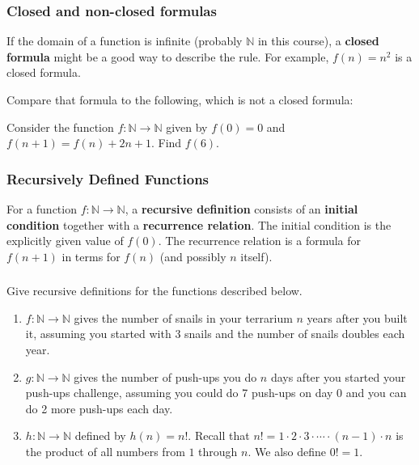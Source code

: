 \documentclass[11pt, compress]{beamer}
\newcommand{\terminology}[1]{\textbf{#1}}\newcommand{\lt}{<}
\newcommand{\N}{\mathbb N}
\begin{document}
\begin{frame}
\frametitle{Closed and non-closed formulas}
 If the domain of a function is infinite (probably \(\N\) in this course), a \terminology{closed formula} might be a good way to describe the rule.  For example, \(f(n) = n^2\) is a closed formula.
 
\pause \vfill 

Compare that formula to the following, which is not a closed formula:
 \begin{example}[0.4.4]Consider the function \(f:\N \to \N\) given by \(f(0) = 0\) and \(f(n+1) = f(n) + 2n+1\). Find \(f(6)\).
\end{example}
\end{frame}
 
\begin{frame}
\frametitle{Recursively Defined Functions}
 For a function \(f:\N \to \N\), a \terminology{recursive definition} consists of an \terminology{initial condition} together with a \terminology{recurrence relation}. The initial condition is the explicitly given value of \(f(0)\). The recurrence relation is a formula for \(f(n+1)\) in terms for \(f(n)\) (and possibly \(n\) itself).
\end{frame}
 
\begin{frame}
\frametitle{}
\begin{example}[0.4.5]Give recursive definitions for the functions described below.
\pause 

\begin{enumerate}[<+->]
\item{} \(f:\N \to \N\) gives the number of snails in your terrarium \(n\) years after you built it, assuming you started with 3 snails and the number of snails doubles each year.


\item{} \(g:\N \to \N\) gives the number of push-ups you do \(n\) days after you started your push-ups challenge, assuming you could do 7 push-ups on day 0 and you can do 2 more push-ups each day.


\item{} \(h:\N \to \N\) defined by \(h(n) = n!\). Recall that \(n! = 1 \cdot 2 \cdot 3 \cdot \cdots \cdot (n-1)\cdot n\) is the product of all numbers from \(1\) through \(n\). We also define \(0! = 1\).

\end{enumerate}

\end{example}
\end{frame}
 
\end{document}
